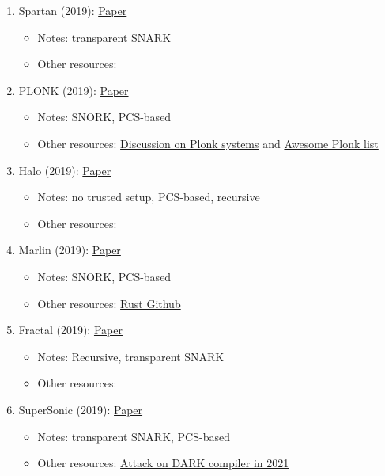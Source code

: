 {\begin{enumerate}
	\item Spartan (2019): \href{https://eprint.iacr.org/2019/550.pdf}{Paper}
	\begin{itemize}[label={--}]
		\item Notes: transparent SNARK
		\item Other resources:
	\end{itemize}

	\item PLONK (2019): \href{https://eprint.iacr.org/2019/953.pdf}{Paper}
	\begin{itemize}[label={--}]
		\item Notes: SNORK, PCS-based
		\item Other resources: \href{https://www.plonk.cafe/t/welcome-to-discussion-of-plonk-related-research/24}{Discussion on Plonk systems} and \href{https://github.com/Fluidex/awesome-plonk}{Awesome Plonk list}
	\end{itemize}

	\item Halo (2019): \href{https://eprint.iacr.org/2019/1021}{Paper}
	\begin{itemize}[label={--}]
		\item Notes: no trusted setup, PCS-based, recursive
		\item Other resources: 
	\end{itemize}

	\item Marlin (2019): \href{https://eprint.iacr.org/2019/1047.pdf}{Paper}
	\begin{itemize}[label={--}]
		\item Notes: SNORK, PCS-based
		\item Other resources: \href{https://github.com/arkworks-rs/marlin}{Rust Github}
	\end{itemize}

	\item Fractal (2019): \href{https://eprint.iacr.org/2019/1076.pdf}{Paper}
	\begin{itemize}[label={--}]
		\item Notes: Recursive, transparent SNARK
		\item Other resources: 
	\end{itemize}

	\item SuperSonic (2019): \href{https://eprint.iacr.org/2019/1229.pdf}{Paper}
	\begin{itemize}[label={--}]
		\item Notes: transparent SNARK, PCS-based
		\item Other resources: \href{https://eprint.iacr.org/2021/358}{Attack on DARK compiler in 2021}
	\end{itemize}


\end{enumerate}}
